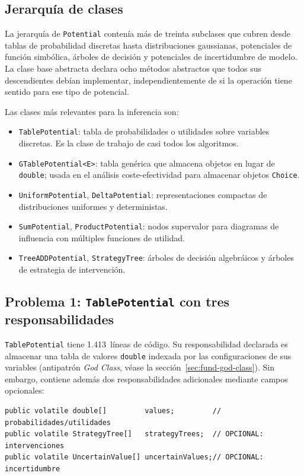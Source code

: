 \documentclass[11pt,a4paper]{article}
\newcommand{\code}[1]{\texttt{#1}}
\begin{document}
\subsection{Jerarquía de clases}

La jerarquía de \code{Potential} contenía más de treinta subclases que
cubren desde tablas de probabilidad discretas hasta distribuciones gaussianas,
potenciales de función simbólica, árboles de decisión y potenciales de
incertidumbre de modelo.  La clase base abstracta declara ocho métodos abstractos
que todos sus descendientes debían implementar, independientemente de si la
operación tiene sentido para ese tipo de potencial.

Las clases más relevantes para la inferencia son:

\begin{itemize}
  \item \code{TablePotential}: tabla de probabilidades o utilidades sobre variables
        discretas.  Es la clase de trabajo de casi todos los algoritmos.
  \item \code{GTablePotential<E>}: tabla genérica que almacena objetos en lugar
        de \code{double}; usada en el análisis coste-efectividad para almacenar
        objetos \code{Choice}.
  \item \code{UniformPotential}, \code{DeltaPotential}: representaciones compactas
        de distribuciones uniformes y deterministas.
  \item \code{SumPotential}, \code{ProductPotential}: nodos supervalor para
        diagramas de influencia con múltiples funciones de utilidad.
  \item \code{TreeADDPotential}, \code{StrategyTree}: árboles de decisión
        algebráicos y árboles de estrategia de intervención.
\end{itemize}

\subsection{Problema 1: \code{TablePotential} con tres responsabilidades}
\label{sec:prob1}

\code{TablePotential} tiene 1.413~líneas de código.  Su responsabilidad
declarada es almacenar una tabla de valores \code{double} indexada por las
configuraciones de sus variables (antipatrón \emph{God Class},
véase la sección~\ref{sec:fund-god-class}).  Sin embargo, contiene además dos
responsabilidades adicionales mediante campos opcionales:

\begin{lstlisting}[caption={Campos principales de \code{TablePotential}}]
public volatile double[]         values;         // probabilidades/utilidades
public volatile StrategyTree[]   strategyTrees;  // OPCIONAL: intervenciones
public volatile UncertainValue[] uncertainValues;// OPCIONAL: incertidumbre
\end{lstlisting}
\end{document}
